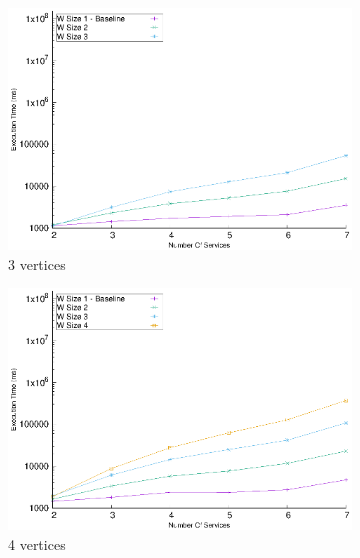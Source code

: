     \begin{figure}[!t]
      \centering
      \begin{subfigure}{0.45\textwidth}
        \includegraphics[width=\textwidth]{Images/graphs/window_time_performance_qualitative_n7_s7_50_80_n3}
        \caption{3 vertices}
        \label{fig:time_window_perce_wide_3n}
      \end{subfigure}
      \hfill
      \begin{subfigure}{0.45\textwidth}
        \includegraphics[width=\textwidth]{Images/graphs/window_time_performance_qualitative_n7_s7_50_80_n4}
        \caption{4 vertices}
        \label{fig:time_window_perce_wide_4n}
      \end{subfigure}
      \hfill
      \begin{subfigure}{0.45\textwidth}

\end{subfigure}
\end{figure}
